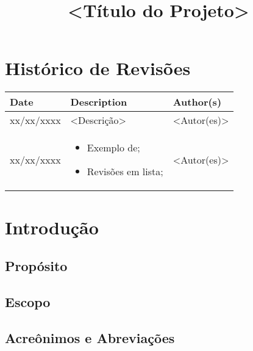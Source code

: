 \documentclass{article}
\title{<Título do Projeto>}
\begin{document}
\newpage

\section*{\center Histórico de Revisões}
  \vspace*{1cm}
  \begin{table}[ht]
    \centering
    \begin{tabular}[pos]{|m{2cm} | m{7.2cm} | m{3.8cm}|} 
      \hline
      \cellcolor[gray]{0.9}
      \textbf{Date} & \cellcolor[gray]{0.9}\textbf{Description} & \cellcolor[gray]{0.9}\textbf{Author(s)}\\ \hline
      \hline
      \small xx/xx/xxxx & \small <Descrição> & \small <Autor(es)> \\ \hline      
      \small xx/xx/xxxx &
      \begin{small}
        \begin{itemize}
          \item Exemplo de;
          \item Revisões em lista;
        \end{itemize}
      \end{small} & \small <Autor(es)> \\ \hline 
    \end{tabular}
  \end{table}

\newpage

\tableofcontents
\newpage

\section{Introdução}

\subsection{Propósito}

\subsection{Escopo}
    
\subsection{Acreônimos e Abreviações}
  
\end{document}
